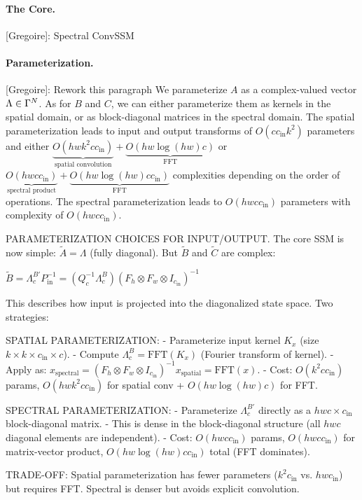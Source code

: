 \documentclass{article}
\newcommand{\greg}[1]{{\color{indigo}[Gregoire]: #1}}
\begin{document}
\paragraph{The Core.} \greg{Spectral ConvSSM}

\paragraph{Parameterization.} \greg{Rework this paragraph} We parameterize $A$ as a complex-valued vector $\Lambda \in \Gamma^N$. As for $B$ and $C$, we can either parameterize them as kernels in the spatial domain, or as block-diagonal matrices in the spectral domain.
%
The spatial parameterization leads to input and output transforms of $O(c c_\mathrm{in} k^2)$ parameters and either $\underbrace{O(hwk^2cc_\mathrm{in})}_{\text{spatial convolution}} + \underbrace{O(hw \log(hw) c)}_{\text{FFT}}$ or $\underbrace{O(hwcc_\mathrm{in})}_{\text{spectral product}} + \underbrace{O(hw \log(hw) c c_\mathrm{in})}_{\text{FFT}}$ complexities depending on the order of operations.
%
The spectral parameterization leads to $O(hwcc_\mathrm{in})$ parameters with complexity of $O(hwcc_\mathrm{in})$.

\begin{thomasbox}
PARAMETERIZATION CHOICES FOR INPUT/OUTPUT. The core SSM is now simple: $\widetilde{A} = \Lambda$ (fully diagonal). But $\widetilde{B}$ and $\widetilde{C}$ are complex:

$\widetilde{B} = \Lambda^{B'}_c P_{\mathrm{in}}^{-1} = (Q_c^{-1} \Lambda^B_c) (F_h \otimes F_w \otimes I_{c_\mathrm{in}})^{-1}$

This describes how input is projected into the diagonalized state space. Two strategies:

SPATIAL PARAMETERIZATION:
- Parameterize input kernel $K_x$ (size $k \times k \times c_\mathrm{in} \times c$).
- Compute $\Lambda^B_c = \mathrm{FFT}(K_x)$ (Fourier transform of kernel).
- Apply as: $x_{\mathrm{spectral}} = (F_h \otimes F_w \otimes I_{c_\mathrm{in}})^{-1} x_{\mathrm{spatial}} = \text{FFT}(x)$.
- Cost: $O(k^2 c c_\mathrm{in})$ params, $O(hwk^2cc_\mathrm{in})$ for spatial conv + $O(hw \log(hw) c)$ for FFT.

SPECTRAL PARAMETERIZATION:
- Parameterize $\Lambda^{B'}_c$ directly as a $hwc \times c_\mathrm{in}$ block-diagonal matrix.
- This is dense in the block-diagonal structure (all $hwc$ diagonal elements are independent).
- Cost: $O(hwcc_\mathrm{in})$ params, $O(hwcc_\mathrm{in})$ for matrix-vector product, $O(hw \log(hw) c c_\mathrm{in})$ total (FFT dominates).

TRADE-OFF: Spatial parameterization has fewer parameters ($k^2 c_\mathrm{in}$ vs. $hwc_\mathrm{in}$) but requires FFT. Spectral is denser but avoids explicit convolution.
\end{thomasbox}
\end{document}
